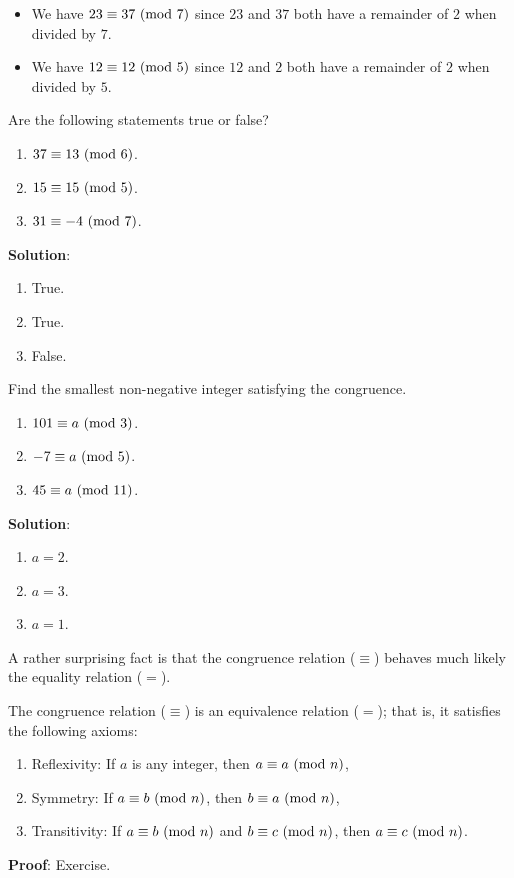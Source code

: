 \begin{Example}{}{}
    \begin{itemize}
        \item We have $ 23\equiv 37\ (\mathrm{mod}\ 7) $ since $ 23 $ and $ 37 $ both have a remainder of $ 2 $ when divided by $ 7 $.
        \item We have $ 12\equiv 12\ (\mathrm{mod}\ 5) $ since $ 12 $ and $ 2 $ both have a remainder of $ 2 $ when divided by $ 5 $.
    \end{itemize}
\end{Example}
\begin{Exercise}{}{}
    Are the following statements true or false?
    \begin{enumerate}[(1)]
        \item $ 37\equiv 13\ (\mathrm{mod}\ 6) $.
        \item $ 15\equiv 15\ (\mathrm{mod}\ 5) $.
        \item $ 31\equiv -4\ (\mathrm{mod}\ 7) $.
    \end{enumerate}
    \textbf{Solution}:
    \begin{enumerate}[(1)]
        \item True.
        \item True.
        \item False.
    \end{enumerate}
\end{Exercise}
\begin{Exercise}{}{}
    Find the smallest non-negative integer satisfying the congruence.
    \begin{enumerate}[(1)]
        \item $ 101\equiv a\ (\mathrm{mod}\ 3) $.
        \item $ -7\equiv a\ (\mathrm{mod}\ 5) $.
        \item $ 45\equiv a\ (\mathrm{mod}\ 11) $.
    \end{enumerate}
    \tcblower{}
    \textbf{Solution}:
    \begin{enumerate}[(1)]
        \item $ a=2 $.
        \item $ a=3 $.
        \item $ a=1 $.
    \end{enumerate}
\end{Exercise}
A rather surprising fact is that the congruence relation ($ \equiv $) behaves much likely
the equality relation ($ = $).
\begin{Proposition}{}{}
    The congruence relation ($ \equiv $) is an equivalence relation ($ = $); that is, it satisfies the following axioms:
    \begin{enumerate}[(1)]
        \item Reflexivity: If $ a $ is any integer, then $ a\equiv a\ (\mathrm{mod}\ n) $,
        \item Symmetry: If $ a\equiv b\ (\mathrm{mod}\ n) $, then $ b\equiv a\ (\mathrm{mod}\ n) $,
        \item Transitivity: If $ a\equiv b\ (\mathrm{mod}\ n) $ and $ b\equiv c\ (\mathrm{mod}\ n) $,
              then $ a\equiv c\ (\mathrm{mod}\ n) $.
    \end{enumerate}
    \tcblower{}
    \textbf{Proof}: Exercise.
\end{Proposition}
